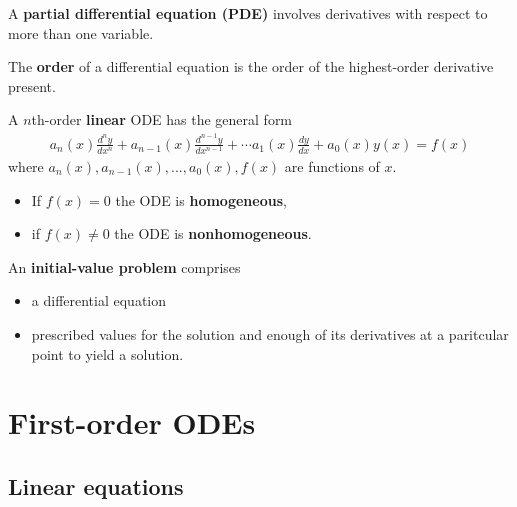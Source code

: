 \documentclass{article}
\begin{document}
\begin{definition}
    A \textbf{partial differential equation (PDE)} involves derivatives with respect to more than one variable.
\end{definition}

\begin{definition}
    The \textbf{order} of a differential equation is the order of the highest-order derivative present.
\end{definition}

\begin{definition}
    A $n$th-order \textbf{linear} ODE has the general form
    \begin{align*}
        a_n(x) \frac{d^ny}{dx^n}+a_{n-1}(x)\frac{d^{n-1}y}{dx^{n-1}}+\cdots a_1(x)\frac{dy}{dx}+a_0(x)y(x)= f(x)
    \end{align*}
    where $a_n(x), a_{n-1}(x), ..., a_0(x), f(x)$ are functions of $x$.
    \begin{itemize}
        \item If $f(x)=0$ the ODE is \textbf{homogeneous},
        \item if $f(x)\not=0$ the ODE is \textbf{nonhomogeneous}.
    \end{itemize}
\end{definition}

\begin{definition}
    An \textbf{initial-value problem} comprises
    \begin{itemize}
        \item a differential equation
        \item prescribed values for the solution and enough of its derivatives at a paritcular point to yield a solution.
    \end{itemize}
\end{definition}



\section{First-order ODEs}



\setcounter{subsection}{1}
\subsection{Linear equations}
\end{document}
